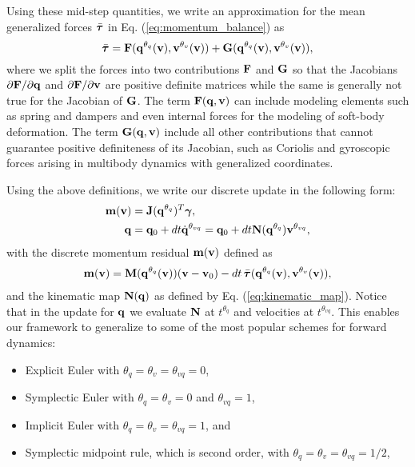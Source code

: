 Using these mid-step quantities, we write an approximation for the mean
generalized forces $\bar{{\bm{\tau}}}$ in Eq. (\ref{eq:momentum_balance}) as
\begin{equation}
	\bar{{\bm{\tau}}} = {\mathbf{F}}({\mathbf{q}}^{\theta_{q}}({\mathbf{v}}), {\mathbf{v}}^{\theta_v}({\mathbf{v}}))+
	{\mathbf{G}}({\mathbf{q}}^{\theta_{q}}({\mathbf{v}}), {\mathbf{v}}^{\theta_v}({\mathbf{v}})),
\end{equation}
where we split the forces into two contributions ${\mathbf{F}}$ and ${\mathbf{G}}$ so that
the Jacobians $\partial {\mathbf{F}}/\partial{\mathbf{q}}$ and $\partial
{\mathbf{F}}/\partial{\mathbf{v}}$ are positive definite matrices while the same is
generally not true for the Jacobian of ${\mathbf{G}}$. The term ${\mathbf{F}}({\mathbf{q}},
{\mathbf{v}})$ can include modeling elements such as spring and dampers and even
internal forces for the modeling of soft-body deformation. The term
${\mathbf{G}}({\mathbf{q}}, {\mathbf{v}})$ include all other contributions that cannot guarantee
positive definiteness of its Jacobian, such as Coriolis and gyroscopic forces
arising in multibody dynamics with generalized coordinates.

Using the above definitions, we write our discrete update in the following form:
\begin{align}
	\mf{m}(\mf{v}) &= \mf{J}(\mf{q}^{\theta_{q}})^T\mf{\bgamma},
	\label{eq:v_update}\\
	\mf{q} &= \mf{q}_0 + dt \dot{\mf{q}}^{\theta_{vq}} = \mf{q}_0 + dt\mf{N}(\mf{q}^{\theta_{q}})\mf{v}^{\theta_{vq}},
	\label{eq:q_update}
\end{align}
with the discrete momentum residual ${\mathbf{m}}({\mathbf{v}})$ defined as
\begin{multline}
	\mf{m}(\mf{v}) =
	\mf{M}(\mf{q}^{\theta_{q}}(\mf{v}))(\mf{v}-\mf{v}_0) -
	dt\,\bar{\vf{\tau}}(\mf{q}^{\theta_{q}}(\mf{v}), \mf{v}^{\theta_v}(\mf{v})),
	\label{eq:m_definition}
\end{multline}
and the kinematic map ${\mathbf{N}}({\mathbf{q}})$ as defined by Eq.
(\ref{eq:kinematic_map}). Notice that in the update for ${\mathbf{q}}$ we evaluate
${\mathbf{N}}$ at $t^{\theta_{q}}$ and velocities at $t^{\theta_{vq}}$. This enables
our framework to generalize to some of the most popular schemes for forward
dynamics:
\begin{itemize}
	\item Explicit Euler with $\theta_q=\theta_{v}=\theta_{vq} = 0$,
	\item Symplectic Euler with $\theta_{q} = \theta_v = 0$ and $\theta_{vq}=1$,
	\item Implicit Euler with $\theta_{q} = \theta_v = \theta_{vq}= 1$, and
	\item Symplectic midpoint rule, which is second order, with $\theta_{q} =
	\theta_v = \theta_{vq}= 1/2$,
\end{itemize}

